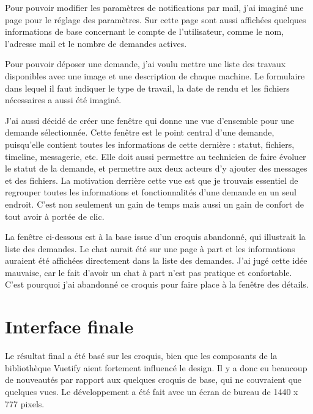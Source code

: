 \documentclass[
    iai, %
    eai, %
]{heig-tb}
\begin{document}
Pour pouvoir modifier les paramètres de notifications par mail, j'ai imaginé une page pour le réglage des paramètres.
Sur cette page sont aussi affichées quelques informations de base concernant le compte de l'utilisateur, comme le nom, l'adresse mail et le nombre de demandes actives.

Pour pouvoir déposer une demande, j'ai voulu mettre une liste des travaux disponibles avec une image et une description de chaque machine.
Le formulaire dans lequel il faut indiquer le type de travail, la date de rendu et les fichiers nécessaires a aussi été imaginé.

\newpage
{}

J'ai aussi décidé de créer une fenêtre qui donne une vue d'ensemble pour une demande sélectionnée.
Cette fenêtre est le point central d'une demande, puisqu'elle contient toutes les informations de cette dernière : statut, fichiers, timeline, messagerie, etc.
Elle doit aussi permettre au technicien de faire évoluer le statut de la demande, et permettre aux deux acteurs d'y ajouter des messages et des fichiers.
La motivation derrière cette vue est que je trouvais essentiel de regrouper toutes les informations et fonctionnalités d'une demande en un seul endroit. C'est non seulement un gain de temps mais aussi un gain de confort de tout avoir à portée de clic.

\newpage
{}

La fenêtre ci-dessous est à la base issue d'un croquis abandonné, qui illustrait la liste des demandes. Le chat aurait été sur une page à part et les informations auraient été affichées directement dans la liste des demandes. J'ai jugé cette idée mauvaise, car le fait d'avoir un chat à part n'est pas pratique et confortable. C'est pourquoi j'ai abandonné ce croquis pour faire place à la fenêtre des détails.


\newpage
\section{Interface finale}
Le résultat final a été basé sur les croquis, bien que les composants de la bibliothèque Vuetify aient fortement influencé le design.
Il y a donc eu beaucoup de nouveautés par rapport aux quelques croquis de base, qui ne couvraient que quelques vues.
Le développement a été fait avec un écran de bureau de 1440 x 777 pixels.
\end{document}
